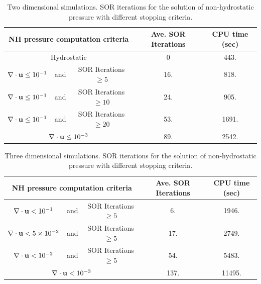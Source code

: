 \begin{table}[h]%
\vspace{0.6in}
\caption{Two dimensional simulations. SOR iterations for the solution of non-hydrostatic pressure with different stopping criteria.}
\vspace{0.2in}
\small
\begin{center}
\begin{tabular}{ccccc} \hline
\multicolumn{3}{c}{NH pressure computation criteria}  & Ave. SOR Iterations & CPU time (sec) \\ \hline
\multicolumn{3}{c}{Hydrostatic}                                 &  0  &   443.    \\
$\nabla \cdot \mathbf{u} \leq 10^{-1}$ & and & SOR Iterations $\geq 5  $ & 16. &   818.    \\
$\nabla \cdot \mathbf{u} \leq 10^{-1}$ & and & SOR Iterations $\geq 10$  & 24. &   905.    \\
$\nabla \cdot \mathbf{u} \leq 10^{-1}$ & and & SOR Iterations $\geq 20$  & 53. &   1691.     \\
\multicolumn{3}{c}{$\nabla \cdot \mathbf{u} \leq 10^{-3}$}   & 89.  &   2542.     \\ \hline
\end{tabular}
\end{center}
\label{tab:ANH-summary-2D}
\end{table}



\begin{table}[h]%
\vspace{1.2in}
\caption{Three dimensional simulations. SOR iterations for the solution of non-hydrostatic pressure with different stopping criteria.}
\vspace{0.2in}
\small
\begin{center}
\begin{tabular}{ccccc} \hline
\multicolumn{3}{c}{NH pressure computation criteria}  & Ave. SOR Iterations & CPU time (sec) \\ \hline
$\nabla \cdot \mathbf{u} < 10^{-1}$ &and& SOR Iterations $\geq 5  $      &6.   &1946.\\
$\nabla \cdot \mathbf{u}<5 \times 10^{-2}$ &and& SOR Iterations $\geq 5$ &17.  &2749.\\
$\nabla \cdot \mathbf{u} < 10^{-2}$ &and& SOR Iterations $\geq 5$        &54.  &5483.\\
\multicolumn{3}{c}{$\nabla \cdot \mathbf{u} < 10^{-3}$}                  &137. &11495.\\ \hline
\end{tabular}
\end{center}
\label{tab:ANH-summary-3D}
\end{table}

